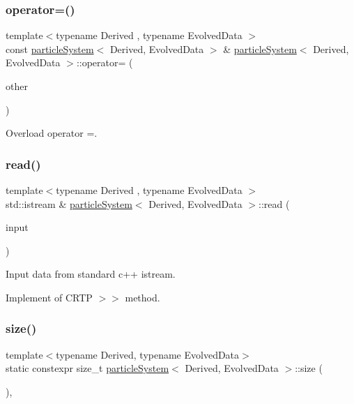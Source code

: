 \subsubsection{\texorpdfstring{operator=()}{operator=()}}
{\footnotesize\ttfamily template$<$typename Derived , typename Evolved\+Data $>$ \\
const \mbox{\hyperlink{classparticle_system}{particle\+System}}$<$ Derived, Evolved\+Data $>$ \& \mbox{\hyperlink{classparticle_system}{particle\+System}}$<$ Derived, Evolved\+Data $>$\+::operator= (\begin{DoxyParamCaption}\item[{const \mbox{\hyperlink{classparticle_system}{particle\+System}}$<$ Derived, Evolved\+Data $>$ \&}]{other }\end{DoxyParamCaption})}



Overload operator =. 

\mbox{\label{classparticle_system_ade26a52e1b5eae4ba5e37a3e4a3b9cd4}} 
\subsubsection{\texorpdfstring{read()}{read()}}
{\footnotesize\ttfamily template$<$typename Derived , typename Evolved\+Data $>$ \\
std\+::istream \& \mbox{\hyperlink{classparticle_system}{particle\+System}}$<$ Derived, Evolved\+Data $>$\+::read (\begin{DoxyParamCaption}\item[{std\+::istream \&}]{input }\end{DoxyParamCaption})}



Input data from standard c++ istream. 

Implement of C\+R\+TP \textquotesingle{}$>$$>$\textquotesingle{} method. \mbox{\label{classparticle_system_add9db06ecfc4ba31291641c5b2157764}} 
\subsubsection{\texorpdfstring{size()}{size()}}
{\footnotesize\ttfamily template$<$typename Derived, typename Evolved\+Data$>$ \\
static constexpr size\+\_\+t \mbox{\hyperlink{classparticle_system}{particle\+System}}$<$ Derived, Evolved\+Data $>$\+::size (\begin{DoxyParamCaption}{ }\end{DoxyParamCaption})\hspace{0.3cm}{\ttfamily [inline]}, {\ttfamily [static]}}




